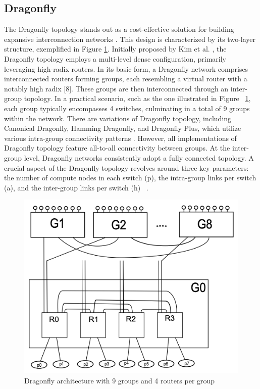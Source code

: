 \subsection{Dragonfly} The Dragonfly topology stands out as a cost-effective
solution for building expansive interconnection networks \cite{kim2008technology}. This design is
characterized by its two-layer structure, exemplified in Figure \ref{fig:dfly}. Initially
proposed by Kim et al. \cite{kim2008technology}, the Dragonfly topology employs a multi-level dense
configuration, primarily leveraging high-radix routers.  In its basic form, a
Dragonfly network comprises interconnected routers forming groups, each
resembling a virtual router with a notably high radix [8]. These groups are then
interconnected through an inter-group topology. In a practical scenario, such as
the one illustrated in Figure ~\ref{fig:dfly}, each group typically encompasses 4 switches,
culminating in a total of 9 groups within the network.  There are variations of
Dragonfly topology, including Canonical Dragonfly, Hamming Dragonfly, and
Dragonfly Plus, which utilize various intra-group connectivity patterns \cite{hastings2015comparing}.
However, all implementations of Dragonfly topology feature all-to-all
connectivity between groups. At the inter-group level, Dragonfly networks
consistently adopt a fully connected topology.  A crucial aspect of the
Dragonfly topology revolves around three key parameters: the number of compute
nodes in each switch (p), the intra-group links per switch (a), and the
inter-group links per switch (h) ~\cite{kim2008technology}. 

\begin{figure}[h]
  \centering
  \includegraphics[width=0.8\columnwidth]{figs/dfly.png}
  \caption{Dragonfly architecture with 9 groups and 4 routers per group}
  \label{fig:dfly}
\end{figure}


